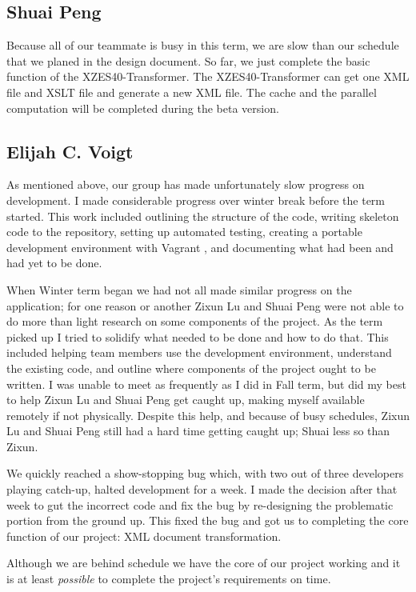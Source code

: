\subsection{Shuai Peng}

Because all of our teammate is busy in this term, we are slow than our schedule that we planed in the design document. 
So far, we just complete the basic function of the XZES40-Transformer.
The XZES40-Transformer can get one XML file and XSLT file and generate a new XML file.
The cache and the parallel computation will be completed during the beta version.  

\subsection{Elijah C. Voigt}

As mentioned above, our group has made unfortunately slow progress on development.
I made considerable progress over winter break before the term started.
This work included outlining the structure of the code, writing skeleton code to the repository, setting up automated testing, creating a portable development environment with Vagrant \cite{vagrant}, and documenting what had been and had yet to be done.

When Winter term began we had not all made similar progress on the application; for one reason or another Zixun Lu and Shuai Peng were not able to do more than light research on some components of the project.
As the term picked up I tried to solidify what needed to be done and how to do that.
This included helping team members use the development environment, understand the existing code, and outline where components of the project ought to be written.
I was unable to meet as frequently as I did in Fall term, but did my best to help Zixun Lu and Shuai Peng get caught up, making myself available remotely if not physically.
Despite this help, and because of busy schedules, Zixun Lu and Shuai Peng still had a hard time getting caught up; Shuai less so than Zixun.

We quickly reached a show-stopping bug which, with two out of three developers playing catch-up, halted development for a week.
I made the decision after that week to gut the incorrect code and fix the bug by re-designing the problematic portion from the ground up.
This fixed the bug and got us to completing the core function of our project: XML document transformation.

Although we are behind schedule we have the core of our project working and it is at least \textit{possible} to complete the project's requirements on time.

